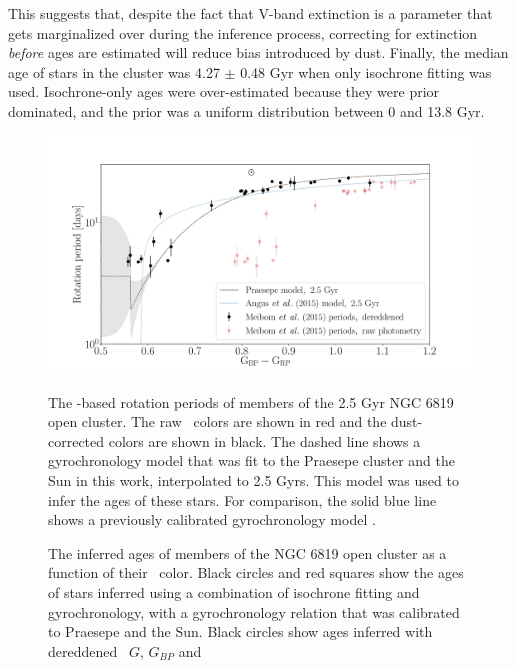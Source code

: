 {This suggests that, despite the fact that V-band extinction is a parameter
that gets marginalized over during the inference process, correcting for
extinction {\it before} ages are estimated will reduce bias introduced by
dust.
Finally, the median age of stars in the cluster was 4.27 $\pm$ 0.48 Gyr when
only isochrone fitting was used.
Isochrone-only ages were over-estimated because they were prior dominated, and
the prior was a uniform distribution between 0 and 13.8 Gyr.
\begin{figure}
  \caption{
    The \kepler-based rotation periods of members of the 2.5 Gyr NGC 6819 open
    cluster.
    The raw \gcolor\ colors are shown in red and the dust-corrected colors are
    shown in black.
    The dashed line shows a gyrochronology model that was fit to the Praesepe
    cluster and the Sun in this work, interpolated to 2.5 Gyrs.
    This model was used to infer the ages of these stars.
    For comparison, the solid blue line shows a previously calibrated
    gyrochronology model \citep{angus2015}.
}
  \centering
    \includegraphics[width=1\textwidth]{NGC6819}
\label{fig:NGC6819}
\end{figure}
\begin{figure}
  \caption{
    The inferred ages of members of the NGC 6819 open cluster as a function of
    their \gcolor\ color.
    Black circles and red squares show the ages of stars inferred using a
    combination of isochrone fitting and gyrochronology, with a gyrochronology
    relation that was calibrated to Praesepe and the Sun.
    Black circles show ages inferred with dereddened \gaia\ $G$, $G_{BP}$ and
}
\end{figure}}
